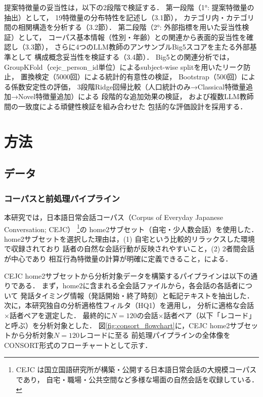 \documentclass[dvipdfmx,11pt,a4paper]{bxjsarticle}
\begin{document}
提案特徴量の妥当性は，以下の2段階で検証する．
第一段階（1°: 提案特徴量の抽出）として，
19特徴量の分布特性を記述し（3.1節），
カテゴリ内・カテゴリ間の相関構造を分析する（3.2節）．
第二段階（2°: 外部指標を用いた妥当性検証）として，
コーパス基本情報（性別・年齢）との関連から表面的妥当性を確認し（3.3節），
さらに4つのLLM教師のアンサンブルBig5スコアを主たる外部基準として
構成概念妥当性を検証する（3.4節）．
Big5との関連分析では，GroupKFold（cejc\_person\_id単位）によるsubject-wise splitを用いたリーク防止，
置換検定（5000回）による統計的有意性の検証，
Bootstrap（500回）による係数安定性の評価，
3段階Ridge回帰比較（人口統計のみ→Classical特徴量追加→Novel特徴量追加）による
段階的な追加効果の検証，
および複数LLM教師間の一致度による頑健性検証を組み合わせた
包括的な評価設計を採用する．

\section{方法}

\subsection{データ}
\label{sec:data}

\subsubsection{コーパスと前処理パイプライン}

本研究では，日本語日常会話コーパス（Corpus of Everyday Japanese Conversation; CEJC）%
\footnote{CEJC は国立国語研究所が構築・公開する日本語日常会話の大規模コーパスであり，
自宅・職場・公共空間など多様な場面の自然会話を収録している．}の
home2サブセット（自宅・少人数会話）を使用した．
home2サブセットを選択した理由は，(1) 自宅という比較的リラックスした環境で収録されており
話者の自然な会話行動が反映されやすいこと，(2) 2者間会話が中心であり
相互行為特徴量の計算が明確に定義できること，による．

CEJC home2サブセットから分析対象データを構築するパイプラインは以下の通りである．
まず，home2に含まれる全会話ファイルから，各会話の各話者について
発話タイミング情報（発話開始・終了時刻）と転記テキストを抽出した．
次に，本研究独自の分析適格性フィルタ（HQ1）を適用し，
分析に適格な会話$\times$話者ペアを選定した．
最終的に$N = 120$の会話$\times$話者ペア（以下「レコード」と呼ぶ）を分析対象とした．
図\ref{fig:consort_flowchart}に，CEJC home2サブセットから分析対象$N = 120$レコードに至る
前処理パイプラインの全体像をCONSORT形式のフローチャートとして示す．
\end{document}
